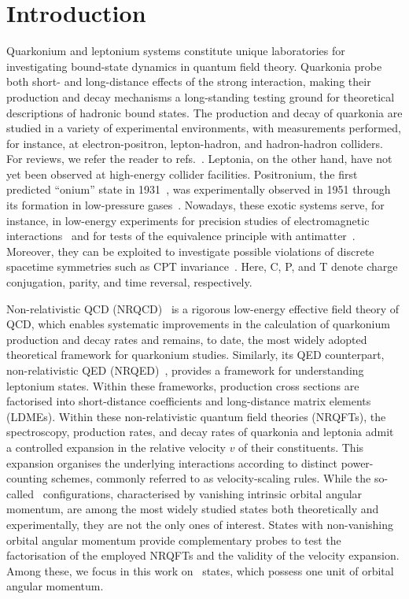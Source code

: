 \section{Introduction}

Quarkonium and leptonium systems constitute unique laboratories for investigating bound-state dynamics in quantum field theory.
Quarkonia probe both short- and long-distance effects of the strong interaction, making their production and decay mechanisms a long-standing testing ground for theoretical descriptions of hadronic bound states. The production and decay of quarkonia are studied in a variety of experimental environments, with measurements performed,
for instance, at electron-positron, lepton-hadron, and hadron-hadron colliders. For reviews, we refer the reader to refs.~\cite{Brambilla:2010cs,Lansberg:2019adr,Chapon:2020heu,Boer:2024ylx}. 
Leptonia, on the other hand, have not yet been observed at high-energy collider facilities. Positronium, the first predicted “onium” state in 1931~\cite{Mohorovicic1934}, was experimentally observed in 1951 through its formation in low-pressure gases~\cite{Deutsch:1951zza}.
Nowadays, these exotic systems serve, for instance, in low-energy experiments for precision studies of electromagnetic interactions~\cite{Karshenboim:2005iy} and for tests of the equivalence principle with antimatter~\cite{AEgIS:2023lpw}. Moreover, they can be exploited to investigate possible violations of discrete spacetime symmetries such as CPT invariance~\cite{Bernreuther:1988tt,Yamazaki:2009hp}. Here, C, P, and T denote charge conjugation, parity, and time reversal, respectively.

Non-relativistic QCD (NRQCD)~\cite{Bodwin:1994jh} is a rigorous low-energy effective field theory of QCD, which
enables systematic improvements in the calculation of quarkonium production and decay rates and remains, to date, the most widely adopted theoretical framework for quarkonium studies. Similarly, its QED counterpart, non-relativistic QED (NRQED)~\cite{Caswell:1985ui}, provides a framework for understanding leptonium states.
Within these frameworks, production cross sections are factorised into short-distance coefficients and long-distance matrix elements (LDMEs). Within these non-relativistic quantum field theories (NRQFTs), the spectroscopy, production rates, and decay rates of quarkonia and leptonia admit a controlled expansion in the relative velocity $v$ of their constituents.
This expansion organises the underlying interactions according to distinct power-counting schemes, commonly referred to as velocity-scaling rules.
While the so-called \swavetxt\ configurations, characterised by vanishing intrinsic orbital angular momentum, are among the most widely studied states both theoretically and experimentally, they are not the only ones of interest. States with non-vanishing orbital angular momentum provide complementary probes to test the factorisation of the employed NRQFTs and the validity of the velocity expansion. Among these, we focus in this work on \pwavetxt\ states, which possess one unit of orbital angular momentum.

